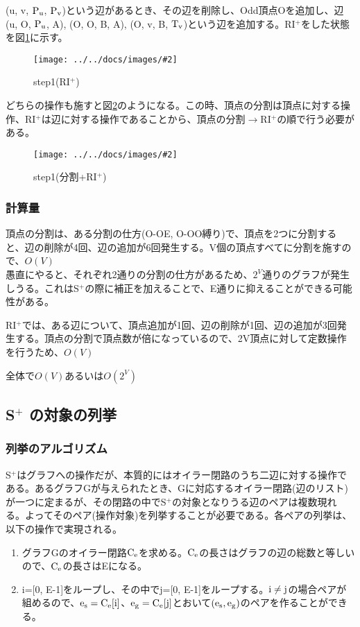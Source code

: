 \documentclass[11pt,a4j]{jarticle}
\newcommand{\splus}{S${}^\text{+}$}
\newcommand{\riplus}{RI${}^\text{+}$}
\newcommand{\f}[1]{$\rm{#1}$} %
\newcommand{\image}[4][height=100pt]{%
\begin{figure}[htbp]
    \centering
    \texttt{[image: ../../docs/images/\#2]}
    \caption{#3}
    \label{fig:#4}
\end{figure}%
}
\newcommand{\ra }{$\rightarrow$}
\newcommand{\tops}[2]{\texorpdfstring{#1}{#2}} %
\begin{document}
(u, v, \f{P_u}, \f{P_v})という辺があるとき、その辺を削除し、Odd頂点Oを追加し、辺(u, O, \f{P_u}, A), (O, O, B, A), (O, v, B, \f{T_v})という辺を追加する。\riplus をした状態を図\ref{fig:riplus}に示す。

\image{extend_riplus.jpg}{step1(\riplus )}{riplus}

どちらの操作も施すと図\ref{fig:total}のようになる。この時、頂点の分割は頂点に対する操作、\riplus は辺に対する操作であることから、頂点の分割\ra \riplus の順で行う必要がある。
\image{extend_total.jpg}{step1(分割+\riplus )}{total}

\subsubsection{計算量}
頂点の分割は、ある分割の仕方(O-OE, O-OO縛り)で、頂点を2つに分割すると、辺の削除が4回、辺の追加が6回発生する。V個の頂点すべてに分割を施すので、$O(V)$\\
愚直にやると、それぞれ2通りの分割の仕方があるため、$2^V$通りのグラフが発生しうる。これは\splus の際に補正を加えることで、E通りに抑えることができる可能性がある。

\riplus では、ある辺について、頂点追加が1回、辺の削除が1回、辺の追加が3回発生する。頂点の分割で頂点数が倍になっているので、2V頂点に対して定数操作を行うため、$O(V)$

全体で$O(V)$あるいは$O(2^V)$

\subsection{\tops{\splus}{S+} の対象の列挙}
\label{enum}
\subsubsection{列挙のアルゴリズム}
\splus はグラフへの操作だが、本質的にはオイラー閉路のうち二辺に対する操作である。あるグラフGが与えられたとき、Gに対応するオイラー閉路(辺のリスト)が一つに定まるが、その閉路の中で\splus の対象となりうる辺のペアは複数現れる。よってそのペア(操作対象)を列挙することが必要である。各ペアの列挙は、以下の操作で実現される。

\begin{enumerate}
    \item グラフGのオイラー閉路\f{C_e}を求める。\f{C_e}の長さはグラフの辺の総数と等しいので、\f{C_e}の長さはEになる。
    \item i=[0, E-1]をループし、その中でj=[0, E-1]をループする。\f{i\neq j}の場合ペアが組めるので、\f{e_s=C_e[i]}、\f{e_g=C_e[j]}とおいて\f{(e_s, e_g)}のペアを作ることができる。
\end{enumerate}
\end{document}
